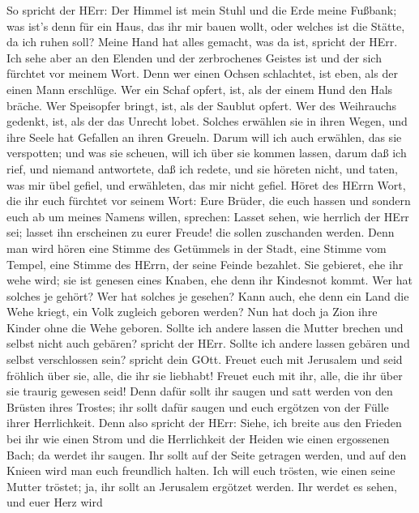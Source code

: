  So spricht der HErr: Der Himmel ist mein Stuhl und die Erde
meine Fußbank; was ist's denn für ein Haus, das ihr mir bauen wollt,
oder welches ist die Stätte, da ich ruhen soll?  Meine Hand
hat alles gemacht, was da ist, spricht der HErr. Ich sehe aber an den
Elenden und der zerbrochenes Geistes ist und der sich fürchtet vor
meinem Wort.  Denn wer einen Ochsen schlachtet, ist eben,
als der einen Mann erschlüge. Wer ein Schaf opfert, ist, als der einem
Hund den Hals bräche. Wer Speisopfer bringt, ist, als der Saublut
opfert. Wer des Weihrauchs gedenkt, ist, als der das Unrecht lobet.
Solches erwählen sie in ihren Wegen, und ihre Seele hat Gefallen an
ihren Greueln.  Darum will ich auch erwählen, das sie
verspotten; und was sie scheuen, will ich über sie kommen lassen, darum
daß ich rief, und niemand antwortete, daß ich redete, und sie höreten
nicht, und taten, was mir übel gefiel, und erwähleten, das mir nicht
gefiel.  Höret des HErrn Wort, die ihr euch fürchtet vor
seinem Wort: Eure Brüder, die euch hassen und sondern euch ab um meines
Namens willen, sprechen: Lasset sehen, wie herrlich der HErr sei; lasset
ihn erscheinen zu eurer Freude! die sollen zuschanden werden.
 Denn man wird hören eine Stimme des Getümmels in der Stadt,
eine Stimme vom Tempel, eine Stimme des HErrn, der seine Feinde
bezahlet.  Sie gebieret, ehe ihr wehe wird; sie ist genesen
eines Knaben, ehe denn ihr Kindesnot kommt.  Wer hat solches
je gehört? Wer hat solches je gesehen? Kann auch, ehe denn ein Land die
Wehe kriegt, ein Volk zugleich geboren werden? Nun hat doch ja Zion ihre
Kinder ohne die Wehe geboren.  Sollte ich andere lassen die
Mutter brechen und selbst nicht auch gebären? spricht der HErr. Sollte
ich andere lassen gebären und selbst verschlossen sein? spricht dein
GOtt.  Freuet euch mit Jerusalem und seid fröhlich über
sie, alle, die ihr sie liebhabt! Freuet euch mit ihr, alle, die ihr über
sie traurig gewesen seid!  Denn dafür sollt ihr saugen und
satt werden von den Brüsten ihres Trostes; ihr sollt dafür saugen und
euch ergötzen von der Fülle ihrer Herrlichkeit.  Denn also
spricht der HErr: Siehe, ich breite aus den Frieden bei ihr wie einen
Strom und die Herrlichkeit der Heiden wie einen ergossenen Bach; da
werdet ihr saugen. Ihr sollt auf der Seite getragen werden, und auf den
Knieen wird man euch freundlich halten.  Ich will euch
trösten, wie einen seine Mutter tröstet; ja, ihr sollt an Jerusalem
ergötzet werden.  Ihr werdet es sehen, und euer Herz wird
